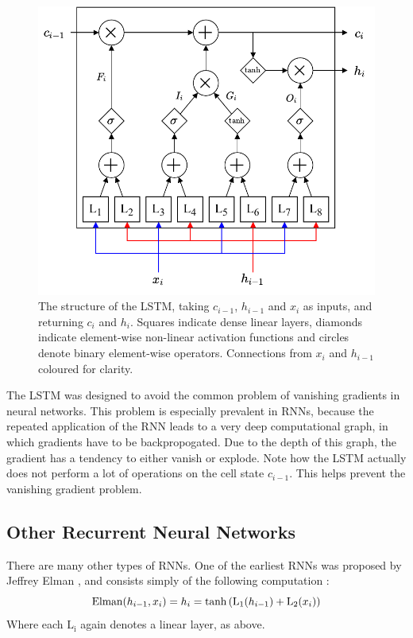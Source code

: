\begin{figure}[ht]
    \centering
    \includegraphics{report/figures/lstm.pdf}
    \caption{The structure of the LSTM, taking $c_{i - 1}$, $h_{i - 1}$ and $x_i$ as inputs, and returning $c_i$ and $h_i$. Squares indicate dense linear layers, diamonds indicate element-wise non-linear activation functions and circles denote binary element-wise operators. Connections from $x_i$ and $h_{i - 1}$ coloured for clarity.}
    \label{fig:lstm_structure}
\end{figure}

The LSTM was designed to avoid the common problem of vanishing gradients in neural networks. This problem is especially prevalent in RNNs, because the repeated application of the RNN leads to a very deep computational graph, in which gradients have to be backpropogated. Due to the depth of this graph, the gradient has a tendency to either vanish or explode. Note how the LSTM actually does not perform a lot of operations on the cell state $c_{i - 1}$. This helps prevent the vanishing gradient problem.

\subsection{Other Recurrent Neural Networks}
There are many other types of RNNs. One of the earliest RNNs was proposed by Jeffrey Elman \cite{elman1990finding}, and consists simply of the following computation \cite{pytorchnn}:
\[\mathrm{Elman}{\mathopen{} \left( h_{i - 1}, x_i \right) \mathclose{}} = h_i = \tanh{\mathopen{} \left( \mathrm{L_1}{\mathopen{} \left( h_{i - 1} \right) \mathclose{}} + \mathrm{L_2}{\mathopen{} \left( x_i \right) \mathclose{}} \right) \mathclose{}}\]
Where each $\mathrm{L_i}$ again denotes a linear layer, as above.

